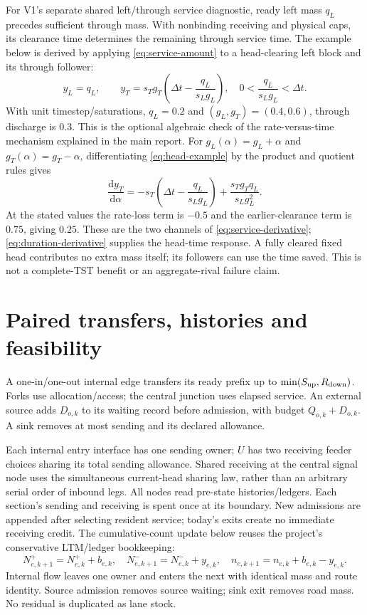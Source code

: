 \documentclass[10pt,a4paper]{article}
\begin{document}
For V1's separate shared left/through service diagnostic, ready left
mass $q_L$ precedes sufficient through mass. With nonbinding receiving
and physical caps, its clearance time determines the remaining through
service time.
The example below is derived by applying \eqref{eq:service-amount} to a head-clearing left block and its through follower:
\begin{equation}
 y_L=q_L,\qquad
 y_T=s_Tg_T\left(\Delta t-\frac{q_L}{s_Lg_L}\right),
 \quad 0<\frac{q_L}{s_Lg_L}<\Delta t.
 \label{eq:head-example}
\end{equation}
With unit timestep/saturations, $q_L=0.2$ and $(g_L,g_T)=(0.4,0.6)$,
through discharge is $0.3$. This is the optional algebraic check of the
rate-versus-time mechanism explained in the main report. For
$g_L(\alpha)=g_L+\alpha$ and $g_T(\alpha)=g_T-\alpha$, differentiating
\eqref{eq:head-example} by the product and quotient rules gives
\begin{equation}
 \frac{\mathrm dy_T}{\mathrm d\alpha}
 =-s_T\left(\Delta t-\frac{q_L}{s_Lg_L}\right)
    +\frac{s_Tg_Tq_L}{s_Lg_L^2}.
 \label{eq:head-example-derivative}
\end{equation}
At the stated values the rate-loss term is $-0.5$ and the earlier-clearance
term is $0.75$, giving $0.25$. These are the two channels of
\eqref{eq:service-derivative}; \eqref{eq:duration-derivative} supplies
the head-time response. A fully cleared fixed head contributes no extra
mass itself; its followers can use the time saved. This is not a
complete-TST benefit or an aggregate-rival failure claim.

\section{Paired transfers, histories and feasibility}

A one-in/one-out internal edge transfers its ready prefix up to
$\min(S_{\rm up},R_{\rm down})$. Forks use allocation/access; the central
junction uses elapsed service. An external source adds $D_{o,k}$ to its
waiting record before admission, with budget $Q_{o,k}+D_{o,k}$.
A sink removes at most sending and its declared allowance.

Each internal entry interface has one sending owner; $U$ has two
receiving feeder choices sharing its total sending allowance. Shared receiving at the
central signal node uses the simultaneous current-head sharing law, rather
than an arbitrary serial order of inbound legs.
All nodes read pre-state histories/ledgers. Each section's sending and
receiving is spent once at its boundary. New admissions are appended
after selecting resident service; today's exits create no immediate
receiving credit.
The cumulative-count update below reuses the project's conservative LTM/ledger bookkeeping:
\begin{equation}
 N^+_{e,k+1}=N^+_{e,k}+b_{e,k},\quad
 N^-_{e,k+1}=N^-_{e,k}+y_{e,k},\quad
 n_{e,k+1}=n_{e,k}+b_{e,k}-y_{e,k}.
 \label{eq:state-update}
\end{equation}
Internal flow leaves one owner and enters the next with identical mass
and route identity. Source admission removes source waiting; sink exit
removes road mass. No residual is duplicated as lane stock.
\end{document}
